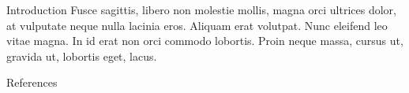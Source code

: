 \documentclass[t]{beamer}
\begin{document}
\begin{frame}[label={sec:org1b2094c}]{}
\begin{columns}
\begin{column}{0.9\columnwidth}
\begin{block}{Introduction}
Fusce sagittis, libero non molestie mollis, magna orci ultrices dolor, at vulputate neque nulla lacinia eros. Aliquam erat volutpat.  Nunc eleifend leo vitae magna. \cite{dr1957cat}  In id erat non orci commodo lobortis.  Proin neque massa, cursus ut, gravida ut, lobortis eget, lacus.
\end{block}

\begin{block}{References}
\printbibliography
\end{block}
\end{column}
\end{columns}
\end{frame}
\end{document}
